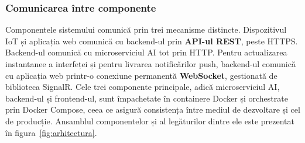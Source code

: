 ﻿\documentclass[12pt,a4paper,twoside]{article}
\begin{document}
\subsubsection{Comunicarea între componente}

Componentele sistemului comunică prin trei mecanisme distincte. Dispozitivul IoT și aplicația web comunică cu backend-ul prin \textbf{API-ul REST}, peste HTTPS. Backend-ul comunică cu microserviciul AI tot prin HTTP. Pentru actualizarea instantanee a interfeței și pentru livrarea notificărilor push, backend-ul comunică cu aplicația web printr-o conexiune permanentă \textbf{WebSocket}, gestionată de biblioteca SignalR. Cele trei componente principale, adică microserviciul AI, backend-ul și frontend-ul, sunt împachetate în containere Docker și orchestrate prin Docker Compose, ceea ce asigură consistența între mediul de dezvoltare și cel de producție. Ansamblul componentelor și al legăturilor dintre ele este prezentat în figura~\ref{fig:arhitectura}.
\end{document}
